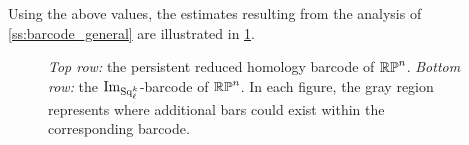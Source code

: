 Using the above values, the estimates resulting from the analysis of \cref{ss:barcode_general} are illustrated in \cref{fig:sq barcodes}.

\begin{figure}
	\centering
	
	\caption{\emph{Top row:} the persistent reduced homology barcode of $\mathbb{RP}^n$.
		\emph{Bottom row:} the $\operatorname{Im}_{\operatorname{Sq}_\ell^k}$-barcode of $\mathbb{RP}^n$.
        In each figure, the gray region represents where additional bars could exist within the corresponding barcode.
	}
	\label{fig:sq barcodes}
\end{figure}